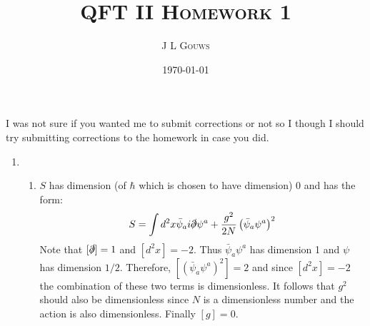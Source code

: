 \documentclass[12pt,a4]{article}
\title{
\textsc{QFT II Homework 1}
}
\author{\textsc{J L Gouws}
}
\date{\today
\\[1cm]}
\begin{document}
\thispagestyle{empty}

\maketitle

I was not sure if you wanted me to submit corrections or not so I though I should try submitting corrections to the homework in case you did.
\begin{enumerate}
  \item
    \begin{enumerate}
      \item 
        $S$ has dimension (of $\hbar$ which is chosen to have dimension) 0 and has the form:
        \begin{equation*}
          S = \int d^2x \bar{\psi}_a i \slashed{\partial} \psi^a + \frac{g^2}{2N} \left(\bar{\psi}_a \psi^a\right)^2
        \end{equation*}
        Note that $[\slashed{\partial}] = 1$ and $[d^2x] = -2$.
        Thus $\bar{\psi}_a \psi^a$ has dimension 1 and $\psi$ has dimension $1/2$.
        Therefore, $[\left(\bar{\psi}_a \psi^a\right)^2] = 2$ and since $[d^2x] = -2$ the combination of these two terms is dimensionless.
        It follows that $g^2$ should also be dimensionless since $N$ is a dimensionless number and the action is also dimensionless.
        Finally $[g] = 0$.


\end{enumerate}
\end{enumerate}
\end{document}
